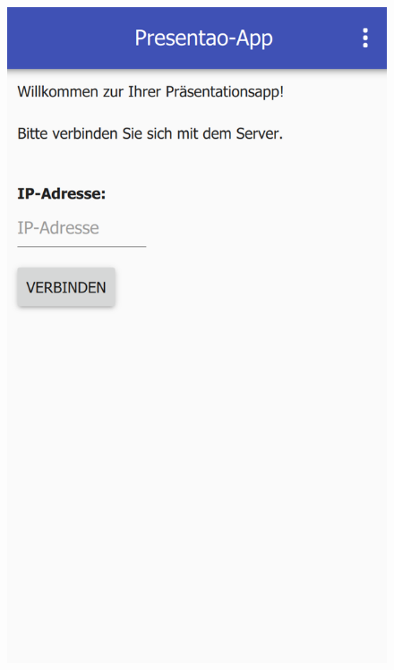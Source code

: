 \begin{figure}[ht!]
	\centering
	\begin{minipage}{0.31\linewidth}
		\centering
		\includegraphics[scale=0.5]{GUI/Bilder/1_Startbildschirm.PNG}
	\end{minipage}
	\begin{minipage}{0.31\linewidth}
		\centering

\end{minipage}
\end{figure}
